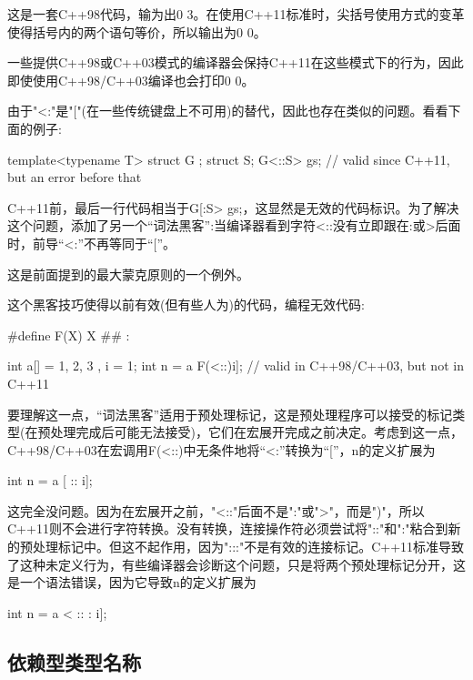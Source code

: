 这是一套C++98代码，输为出0 3。在使用C++11标准时，尖括号使用方式的变革使得括号内的两个语句等价，所以输出为0 0。

\begin{notice}一些提供C++98或C++03模式的编译器会保持C++11在这些模式下的行为，因此即使使用C++98/C++03编译也会打印0 0。
\end{notice}

由于"<:"是"["(在一些传统键盘上不可用)的替代，因此也存在类似的问题。看看下面的例子:

\begin{cpp}
template<typename T> struct G {};
struct S;
G<::S> gs; // valid since C++11, but an error before that
\end{cpp}

C++11前，最后一行代码相当于G[:S> gs;，这显然是无效的代码标识。为了解决这个问题，添加了另一个“词法黑客”:当编译器看到字符<::没有立即跟在:或>后面时，前导“<:”不再等同于“[”。

\begin{notice}这是前面提到的最大蒙克原则的一个例外。
\end{notice}

这个黑客技巧使得以前有效(但有些人为)的代码，编程无效代码:

\begin{cpp}
#define F(X) X ## :

int a[] = { 1, 2, 3 }, i = 1;
int n = a F(<::)i]; // valid in C++98/C++03, but not in C++11
\end{cpp}

要理解这一点，“词法黑客”适用于预处理标记，这是预处理程序可以接受的标记类型(在预处理完成后可能无法接受)，它们在宏展开完成之前决定。考虑到这一点，C++98/C++03在宏调用F(<::)中无条件地将“<:”转换为“[”，n的定义扩展为

\begin{cpp}
int n = a [ :: i];
\end{cpp}

这完全没问题。因为在宏展开之前，"<::"后面不是":"或">"，而是")"，所以C++11则不会进行字符转换。没有转换，连接操作符必须尝试将"::"和":"粘合到新的预处理标记中。但这不起作用，因为":::"不是有效的连接标记。C++11标准导致了这种未定义行为，有些编译器会诊断这个问题，只是将两个预处理标记分开，这是一个语法错误，因为它导致n的定义扩展为

\begin{cpp}
int n = a < :: : i];
\end{cpp}

\subsection{依赖型类型名称}

